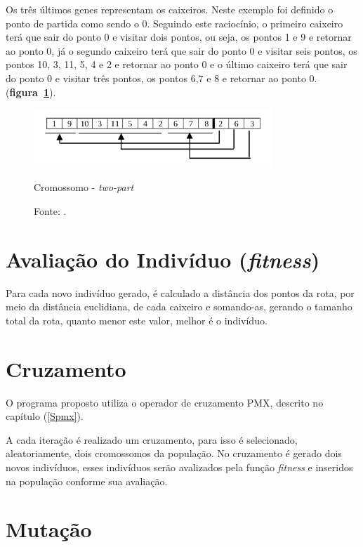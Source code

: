 \documentclass{abnt}
\begin{document}
			Os três últimos genes representam os caixeiros. Neste exemplo foi definido o ponto de partida como sendo o 0. Seguindo este raciocínio, o primeiro caixeiro terá que sair do ponto 0 e visitar dois pontos, ou seja, os pontos 1 e 9 e retornar ao ponto 0, já o segundo caixeiro terá que sair do ponto 0 e visitar seis pontos, os pontos 10, 3, 11, 5, 4 e 2 e retornar ao ponto 0 e o último caixeiro terá que sair do ponto 0 e visitar três pontos, os pontos 6,7 e 8 e retornar ao ponto 0. (\textbf{figura~\ref{two-part}}).

			\begin{figure}[h]
				\centering
		        \includegraphics[width = 9cm,keepaspectratio]{img/two-part.png}
		        \caption{Cromossomo - \textit{two-part}}
		        \caption*{Fonte: \cite{0011-pdf}.}
		        \label{two-part}
	   		\end{figure}
	   	
	   	\section{Avaliação do Indivíduo (\textit{fitness})}

		Para cada novo indivíduo gerado, é calculado a distância dos pontos da rota, por meio da distância euclidiana,  de cada caixeiro e somando-as, gerando o tamanho total da rota, quanto menor este valor, melhor é o indivíduo.
				

		\section{Cruzamento}

			O programa proposto utiliza o operador de cruzamento PMX, descrito no capítulo (\ref{Spmx}). 
			
			A cada iteração é realizado um cruzamento, para isso é selecionado, aleatoriamente, dois cromossomos da população. No cruzamento é gerado dois novos indivíduos, esses indivíduos serão avalizados pela função \textit{fitness} e inseridos na população conforme sua avaliação.

		\section{Mutação}
\end{document}
